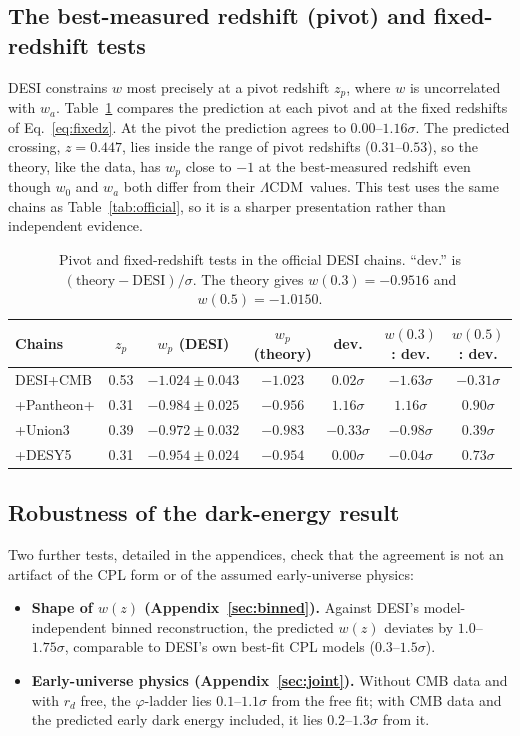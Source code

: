 \documentclass[11pt]{article}
\theoremstyle{definition}
\theoremstyle{remark}
\newcommand{\gr}{\varphi}
\newcommand{\LCDM}{$\Lambda$CDM}
\begin{document}
\subsection{The best-measured redshift (pivot) and fixed-redshift tests}\label{sec:pivot}

DESI constrains $w$ most precisely at a pivot redshift $z_p$, where $w$ is uncorrelated with $w_a$. Table~\ref{tab:pivot} compares the prediction at each pivot and at the fixed redshifts of Eq.~\eqref{eq:fixedz}. At the pivot the prediction agrees to $0.00$--$1.16\sigma$. The predicted crossing, $z = 0.447$, lies inside the range of pivot redshifts ($0.31$--$0.53$), so the theory, like the data, has $w_p$ close to $-1$ at the best-measured redshift even though $w_0$ and $w_a$ both differ from their \LCDM\ values. This test uses the same chains as Table~\ref{tab:official}, so it is a sharper presentation rather than independent evidence.

\begin{table}[t]
\centering
\small
\begin{tabular}{lcccccc}
\toprule
Chains & $z_p$ & $w_p$ (DESI) & $w_p$ (theory) & dev. & $w(0.3)$: dev. & $w(0.5)$: dev. \\
\midrule
DESI+CMB & 0.53 & $-1.024 \pm 0.043$ & $-1.023$ & $0.02\sigma$ & $-1.63\sigma$ & $-0.31\sigma$ \\
+Pantheon+ & 0.31 & $-0.984 \pm 0.025$ & $-0.956$ & $1.16\sigma$ & $1.16\sigma$ & $0.90\sigma$ \\
+Union3 & 0.39 & $-0.972 \pm 0.032$ & $-0.983$ & $-0.33\sigma$ & $-0.98\sigma$ & $0.39\sigma$ \\
+DESY5 & 0.31 & $-0.954 \pm 0.024$ & $-0.954$ & $0.00\sigma$ & $-0.04\sigma$ & $0.73\sigma$ \\
\bottomrule
\end{tabular}
\caption{Pivot and fixed-redshift tests in the official DESI chains. ``dev.'' is $(\text{theory} - \text{DESI})/\sigma$. The theory gives $w(0.3) = -0.9516$ and $w(0.5) = -1.0150$.}
\label{tab:pivot}
\end{table}

\subsection{Robustness of the dark-energy result}\label{sec:robust}

Two further tests, detailed in the appendices, check that the agreement is not an artifact of the CPL form or of the assumed early-universe physics:
\begin{itemize}
\item \textbf{Shape of $w(z)$ (Appendix~\ref{sec:binned}).} Against DESI's model-independent binned reconstruction, the predicted $w(z)$ deviates by $1.0$--$1.75\sigma$, comparable to DESI's own best-fit CPL models ($0.3$--$1.5\sigma$).
\item \textbf{Early-universe physics (Appendix~\ref{sec:joint}).} Without CMB data and with $r_d$ free, the $\gr$-ladder lies $0.1$--$1.1\sigma$ from the free fit; with CMB data and the predicted early dark energy included, it lies $0.2$--$1.3\sigma$ from it.
\end{itemize}
\end{document}
